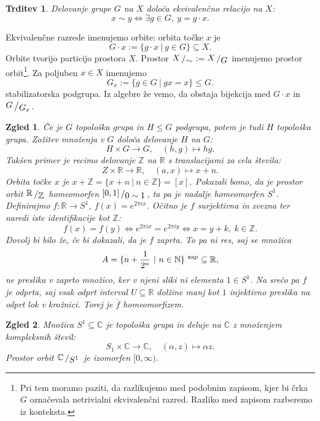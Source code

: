 \documentclass[10pt, a4paper]{article}
\newtheorem{trditev}[izr]{Trditev}
\newtheorem{zgled}{Zgled}[section]
\newcommand{\N}{\mathbb {N}}
\newcommand{\Z}{\mathbb {Z}}
\newcommand{\R}{\mathbb {R}}
\newcommand{\C}{\mathbb {C}}
\newcommand{\quot}[2]{{\raisebox{0.1em}{$#1$}\left/\raisebox{-0.2em}{$#2$}\right.}}
\begin{document}
\begin{trditev}
  Delovanje grupe $G$ na $X$ določa ekvivalenčno relacijo na $X$:
  $$x \sim y \Leftrightarrow \exists g \in G,\ y = g \cdot x.$$
\end{trditev}
\vspace*{-3mm}
Ekvivalenčne razrede imenujemo orbite: orbita točke $x$ je 
$$G \cdot x := \{g \cdot x\ |\ g \in G\} \subseteq X.$$
Orbite tvorijo particijo prostora $X$. Prostor $\quot{X}{\sim} := \quot{X}{G}$
imenujemo prostor orbit\footnote[1]{Pri tem moramo paziti, da razlikujemo med podobnim zapisom, kjer
bi črka $G$ označevala netrivialni ekvivalenčni razred. Razliko med zapisom razberemo iz konteksta.}.
Za poljuben $x \in X$ imenujemo 
$$G_x := \{ g \in G\ |\ gx = x\} \leq G.$$
stabilizatorska podgrupa. Iz algebre že vemo, da obstaja bijekcija med $G \cdot x$ in $\quot{G}{G_x}$. 

\begin{zgled}
  Če je $G$ topološka grupa in $H \leq G$ podgrupa, potem je tudi $H$ topološka grupa.
  Zožitev množenja v $G$ določa delovanje $H$ na $G$:
  $$H \times G \to G,\quad (h, g) \mapsto hg.$$
  Takšen primer je recimo delovanje $\Z$ na $\R$ s translacijami za cela števila:
  $$Z \times \R \to \R,\quad (a, x) \mapsto x + n.$$
  Orbita točke $x$ je $x + \Z = \{x + n\ |\ n \in \Z\} = [x]$.
  Pokazali bomo, da je prostor orbit $\quot{\R}{\Z}$ homeomorfen $\quot{[0, 1]}{0 \sim 1}$,
  ta pa je nadalje homeomorfen $S^1$.
  \adjustbox{scale=1.5,center}{
    \begin{tikzcd}
        \R \arrow[r, "f"] \arrow[d, "q"] 
          & S^1\\
        \quot{\R}{\Z} \arrow[ur, dashed, "\overline{f}"]
          &  
    \end{tikzcd}
  }
  Definirajmo $f: \R \to S^1$, $f(x) = e^{2\pi i x}$. Očitno je $f$ surjektivna in zvezna
  ter naredi iste identifikacije kot $\Z$:
  $$f(x) = f(y) \Leftrightarrow e^{2 \pi i x} = e^{2 \pi i y} \Leftrightarrow x = y + k,\ k \in \Z.$$
  Dovolj bi bilo že, če bi dokazali, da je $f$ zaprta. To pa ni res, saj se množica 
  $$A = \{n + \frac{1}{2^n}\ |\ n \in \N\}^{\ \textup{zap}} \subseteq \R,$$
  ne preslika v zaprto množico, ker v njeni sliki ni elementa $1 \in S^1$.
  Na srečo pa $f$ je odprta, saj vsak odprt interval $U \subseteq \R$ dolžine manj kot $1$ 
  injektivno preslika na odprt lok v krožnici. Torej je $\overline{f}$ homeomorfizem. 
\end{zgled}

\begin{zgled}
  Množica $S^1 \subseteq \C$ je topološka grupa in deluje na 
  $\C$ z množenjem kompleksnih števil:
  $$S_1 \times \C \to \C,\quad (\alpha, z) \mapsto \alpha z.$$
  Prostor orbit $\quot{\C}{S^1}$ je izomorfen $[0, \infty)$.
\end{zgled}
\end{document}
